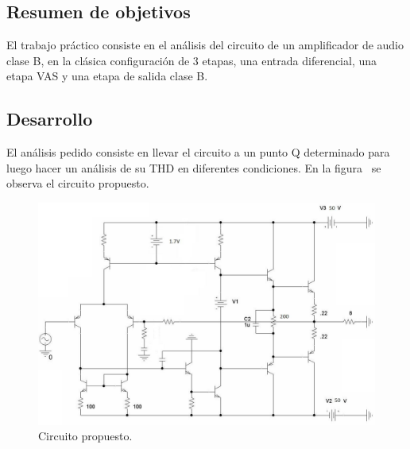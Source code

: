 
\subsection{Resumen de objetivos}


\normalfont

El trabajo práctico consiste en el análisis del circuito de un amplificador de audio clase B, en la clásica configuración de 3 etapas, una entrada diferencial, una etapa VAS y una etapa de salida clase B.


\subsection{Desarrollo}

El análisis pedido consiste en llevar el circuito a un punto Q determinado para luego hacer un análisis de su THD en diferentes condiciones. En la figura~ se observa el circuito propuesto.


\begin{figure}[H] %
\begin{center}
\includegraphics[width=1.0 \textwidth, angle=0]{./img/enunciado/circuito_enunciado.png}
\caption{\label{fig:fig_original_circuit}\footnotesize{Circuito propuesto.}}
\end{center}
\end{figure}


\clearpage
